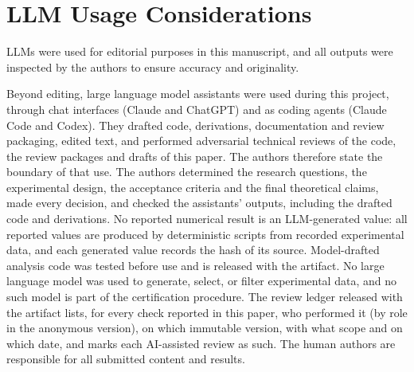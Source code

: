 
\section*{LLM Usage Considerations}
\setcounter{paragraph}{0}
\let\satmlSavedTheHparagraph\theHparagraph
\renewcommand{\theHparagraph}{llmusage.\arabic{paragraph}} %

LLMs were used for editorial purposes in this manuscript, and all outputs were inspected by the authors to ensure accuracy and originality.

Beyond editing, large language model assistants were used during this project, through chat interfaces (Claude and ChatGPT) and as coding agents (Claude Code and Codex). They drafted code, derivations, documentation and review packaging, edited text, and performed adversarial technical reviews of the code, the review packages and drafts of this paper. The authors therefore state the boundary of that use. The authors determined the research questions, the experimental design, the acceptance criteria and the final theoretical claims, made every decision, and checked the assistants' outputs, including the drafted code and derivations. No reported numerical result is an LLM-generated value: all reported values are produced by deterministic scripts from recorded experimental data, and each generated value records the hash of its source. Model-drafted analysis code was tested before use and is released with the artifact. No large language model was used to generate, select, or filter experimental data, and no such model is part of the certification procedure. The review ledger released with the artifact lists, for every check reported in this paper, who performed it (by role in the anonymous version), on which immutable version, with what scope and on which date, and marks each AI-assisted review as such. The human authors are responsible for all submitted content and results.

